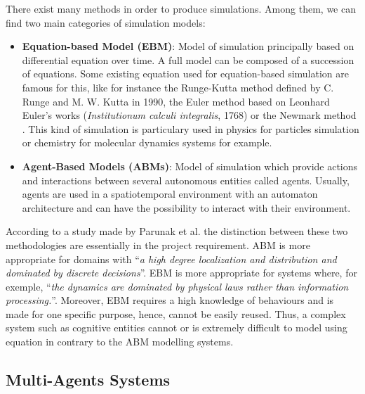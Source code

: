 \documentclass[12pt, a4paper]{memoir} %
\begin{document}
		There exist many methods in order to produce simulations.
		Among them, we can find two main categories of simulation models:
		\begin{itemize}
			\item \textbf{Equation-based Model (EBM)}: Model of simulation principally based on differential equation over time.
			A full model can be composed of a succession of equations. Some existing equation used for equation-based simulation
			are famous for this, like for instance the Runge-Kutta method defined by C. Runge and M. W. Kutta in 1990, the Euler method based
			on Leonhard Euler's works (\textit{Institutionum calculi integralis}, 1768) or the Newmark method \cite{newmark1959}.
			This kind of simulation is particulary used in physics for particles simulation \cite{greengard1987} or chemistry for
			molecular dynamics systems\cite{gunsteren1990} for example. %
			\item \textbf{Agent-Based Models (ABMs)}: Model of simulation which provide actions and interactions between several
			autonomous entities called agents. Usually, agents are used in a spatiotemporal environment with an automaton architecture
			and can have the possibility to interact with their environment.
		\end{itemize}

		According to a study made by Parunak et al. \cite{parunak1998} the distinction between these two methodologies are essentially in
		the project requirement. ABM is more appropriate for domains with \textquotedblleft \textit{a high degree localization and distribution and dominated by discrete decisions}\textquotedblright.
		EBM is more appropriate for systems where, for exemple, \textquotedblleft \textit{the dynamics are dominated by physical laws rather than information processing.}\textquotedblright.
		Moreover, EBM requires a high knowledge of behaviours and is made for one specific purpose, hence, cannot be easily reused. Thus, a complex system such as cognitive entities
		cannot or is extremely difficult to model using equation in contrary to the ABM modelling systems.

		\subsection{Multi-Agents Systems}
\end{document}
